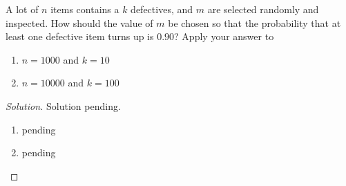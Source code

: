 \begin{exercise}{18} \label{1.18}
    A lot of \( n \) items contains a \( k \) defectives, and \( m \) are selected randomly and inspected. How should the value of \( m \) be chosen so that the probability that at least one defective item turns up is \( 0.90 \)? Apply your answer to
    \begin{enumerate}
        \item \( n = 1000 \) and \( k = 10 \)
        \item \( n = 10000 \) and \( k = 100 \)
    \end{enumerate}
    
    \begin{proof}[Solution] Solution pending.
        \begin{enumerate}
            \item pending
            
            \item pending
        \end{enumerate}
    \end{proof}
\end{exercise}